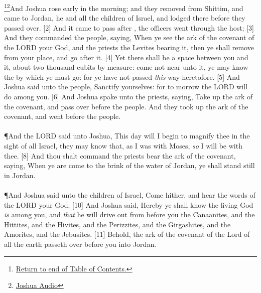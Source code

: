 \footnote{\textcolor[cmyk]{0.99998,1,0,0}{\hyperlink{TOC}{Return to end of Table of Contents.}}}\footnote{\href{https://audiobible.com/bible/joshua_1.html}{\textcolor[cmyk]{0.99998,1,0,0}{Joshua Audio}}}\textcolor[cmyk]{0.99998,1,0,0}{And Joshua rose early in the morning; and they removed from Shittim, and came to Jordan, he and all the children of Israel, and lodged there before they passed over.}
[2] \textcolor[cmyk]{0.99998,1,0,0}{And it came to pass after ,  the officers went through the host;}
[3] \textcolor[cmyk]{0.99998,1,0,0}{And they commanded the people, saying, When ye see the ark of the covenant of the LORD your God, and the priests the Levites bearing it, then ye shall remove from your place, and go after it.}
[4] \textcolor[cmyk]{0.99998,1,0,0}{Yet there shall be a space between you and it, about two thousand cubits by measure: come not near unto it,  ye may know the  by which ye must go: for ye have not passed \emph{this} way heretofore.}
[5] \textcolor[cmyk]{0.99998,1,0,0}{And Joshua said unto the people, Sanctify yourselves: for to morrow the LORD will do  among you.}
[6] \textcolor[cmyk]{0.99998,1,0,0}{And Joshua spake unto the priests, saying, Take up the ark of the covenant, and pass over before the people. And they took up the ark of the covenant, and went before the people.}\\
\\
\P \textcolor[cmyk]{0.99998,1,0,0}{And the LORD said unto Joshua, This day will I begin to magnify thee in the sight of all Israel,  they may know that, as I was with Moses, \emph{so} I will be with thee.}
[8] \textcolor[cmyk]{0.99998,1,0,0}{And thou shalt command the priests  bear the ark of the covenant, saying, When ye are come to the brink of the water of Jordan, ye shall stand still in Jordan.}\\
\\
\P \textcolor[cmyk]{0.99998,1,0,0}{And Joshua said unto the children of Israel, Come hither, and hear the words of the LORD your God.}
[10] \textcolor[cmyk]{0.99998,1,0,0}{And Joshua said, Hereby ye shall know  the living God \emph{is} among you, and \emph{that} he will  drive out from before you the Canaanites, and the Hittites, and the Hivites, and the Perizzites, and the Girgashites, and the Amorites, and the Jebusites.}
[11] \textcolor[cmyk]{0.99998,1,0,0}{Behold, the ark of the covenant of the Lord of all the earth passeth over before you into Jordan.}

